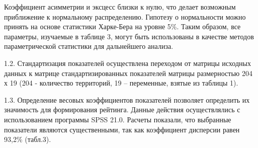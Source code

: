 \begin{multicols}{2}
Коэффициент асимметрии и эксцесс близки к нулю, что делает возможным
приближение к нормальному распределению. Гипотезу о нормальности можно
принять на основе статистики Харке-Бера на уровне 5\%. Таким образом,
все параметры, изучаемые в таблице 3, могут быть использованы в качестве
методов параметрической статистики для дальнейшего анализа.

1.2. Стандартизация показателей осуществлена переходом от матрицы
исходных данных к матрице стандартизированных показателей матрицы
размерностью 204 х 19 (204 - количество территорий, 19 -- переменные,
взятые из таблицы 1).

1.3. Определение весовых коэффициентов показателей позволяет определить
их значимость для формирования рейтинга. Данные действия осуществлялись
с использованием программы SPSS 21.0. Расчеты показали, что выбранные
показатели являются существенными, так как коэффициент дисперсии равен
93,2\% (табл.3).
\end{multicols}

